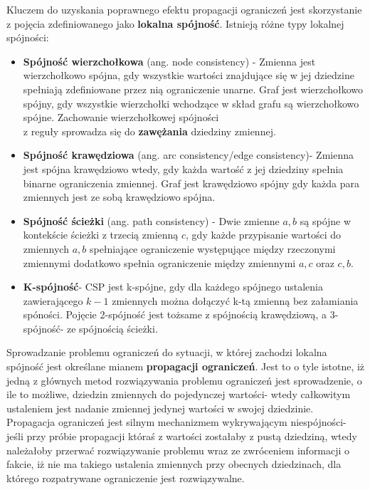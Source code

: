     Kluczem do uzyskania poprawnego efektu propagacji ograniczeń jest skorzystanie z pojęcia zdefiniowanego jako \textbf{lokalna spójność}.
    Istnieją różne typy lokalnej spójności:
    \begin{itemize}
        \item \textbf{Spójność wierzchołkowa} (ang. node consistency) - Zmienna jest wierzchołkowo spójna, 
        gdy wszystkie wartości znajdujące się w jej dziedzine spełniają zdefiniowane przez nią ograniczenie unarne.
        Graf jest wierzchołkowo spójny, gdy wszystkie wierzchołki wchodzące w skład grafu są wierzchołkowo spójne.
        Zachowanie wierzchołkowej spójności \\
        z reguły sprowadza się do \textbf{zawężania} dziedziny zmiennej.
        \item \textbf{Spójność krawędziowa} (ang. arc consistency/edge consistency)- Zmienna jest spójna krawędziowo wtedy, 
        gdy każda wartość z jej dziedziny spełnia binarne ograniczenia zmiennej. Graf jest krawędziowo spójny gdy każda para 
        zmiennych jest ze sobą krawędziowo spójna.
        \item \textbf{Spójność ścieżki} (ang. path consistency) - Dwie zmienne $a,b$ są spójne w kontekście ścieżki z trzecią zmienną 
        $c$, gdy każde przypisanie wartości do zmiennych $a,b$ spełniające ograniczenie występujące między rzeczonymi zmiennymi dodatkowo 
        spełnia ograniczenie między zmiennymi $a,c$ oraz $c,b$.
        \item \textbf{K-spójność}- CSP jest k-spójne, gdy dla każdego spójnego ustalenia zawierającego $k-1$ zmiennych można dołączyć k-tą zmienną 
        bez załamiania spóności. Pojęcie 2-spójność jest tożsame z spójnością krawędziową, a 3-spójność- ze spójnością ścieżki.
    \end{itemize}

    Sprowadzanie problemu ograniczeń do sytuacji, w której zachodzi lokalna spójność jest określane mianem \textbf{propagacji ograniczeń}. 
    Jest to o tyle istotne, iż jedną z głównych metod rozwiązywania problemu ograniczeń jest sprowadzenie, o ile to możliwe, dziedzin zmiennych do pojedynczej wartości- 
    wtedy całkowitym ustaleniem jest nadanie zmiennej jedynej wartości w swojej dziedzinie. Propagacja ograniczeń jest silnym mechanizmem wykrywającym 
    niespójności- jeśli przy próbie propagacji któraś z wartości zostałaby z pustą dziedziną, wtedy należałoby przerwać rozwiązywanie problemu wraz 
    ze zwróceniem informacji o fakcie, iż nie ma takiego ustalenia zmiennych przy obecnych dziedzinach, dla którego rozpatrywane ograniczenie 
    jest rozwiązywalne.

